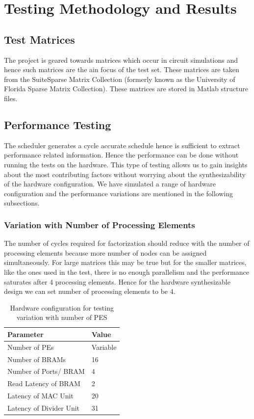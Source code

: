 \chapter{Testing Methodology and Results}
\section{Test Matrices}
The project is geared towards matrices which occur in circuit simulations and hence
such matrices are the ain focus of the test set. These matrices are taken from the 
SuiteSparse Matrix Collection (formerly known as the University of Florida Sparse Matrix Collection).
These matrices are stored in Matlab structure files.

\section{Performance Testing}
The scheduler generates a cycle accurate schedule hence is sufficient to 
extract performance related information. Hence the performance can be done
without running the tests on the hardware. This type of testing allows us to 
gain insights about the most contributing factors without worrying about the 
synthesizability of the hardware configuration. We have simulated a range
of hardware configuration and the performance variations are mentioned in the following 
subsections.

\subsection{Variation with Number of Processing Elements}
The number of cycles required for factorization should reduce with the number of
processing elements because more number of nodes can be assigned simultaneously.
For large matrices this may be true but for the smaller matrices, like the ones used
in the test, there is no enough parallelism and the performance saturates after 4
processing elements. Hence for the hardware synthesizable design we can set number of
processing elements to be 4.

\begin{table}[H]
    \centering
    \caption{Hardware configuration for testing variation with number of PES}
    \label{tab:res:peVar:hwConfig}
    \begin{tabular}{L{6cm} L{1.5cm}}
        \toprule
        Parameter & Value \\
        \midrule
        Number of PEs           & Variable  \\
        Number of BRAMs         & 16         \\
        Number of Ports/ BRAM   & 4         \\
        Read Latency of BRAM    & 2          \\
        Latency of MAC Unit     & 20          \\
        Latency of Divider Unit & 31          \\
        \bottomrule
    \end{tabular}
\end{table}

